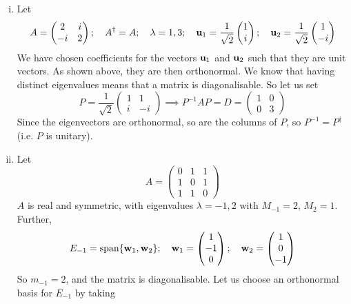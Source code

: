 \begin{enumerate}[(i)]
	\item Let
	      \[ A = \begin{pmatrix}
			      2 & i \\ -i & 2
		      \end{pmatrix};\quad A^\dagger = A;\quad \lambda = 1, 3;\quad\vb u_1 = \frac{1}{\sqrt{2}} \begin{pmatrix}
			      1 \\i
		      \end{pmatrix};\quad\vb u_2 = \frac{1}{\sqrt{2}} \begin{pmatrix}
			      1 \\-i
		      \end{pmatrix} \]
	      We have chosen coefficients for the vectors $\vb u_1$ and $\vb u_2$ such that they are unit vectors. As shown above, they are then orthonormal. We know that having distinct eigenvalues means that a matrix is diagonalisable. So let us set
	      \[ P =  \frac{1}{\sqrt{2}} \begin{pmatrix}
			      1 & 1 \\ i & -i
		      \end{pmatrix} \implies P^{-1}AP = D = \begin{pmatrix}
			      1 & 0 \\ 0 & 3
		      \end{pmatrix} \]
	      Since the eigenvectors are orthonormal, so are the columns of $P$, so $P^{-1} = P^\dagger$ (i.e. $P$ is unitary).
	\item Let
	      \[ A = \begin{pmatrix}
			      0 & 1 & 1 \\ 1 & 0 & 1 \\ 1 & 1 & 0
		      \end{pmatrix} \]
	      $A$ is real and symmetric, with eigenvalues $\lambda = -1, 2$ with $M_{-1} = 2$, $M_2 = 1$. Further,
	      \[ E_{-1} = \operatorname{span} \{ \vb w_1, \vb w_2 \};\quad \vb w_1 = \begin{pmatrix}
			      1 \\ -1 \\ 0
		      \end{pmatrix};\quad \vb w_2 = \begin{pmatrix}
			      1 \\ 0 \\ -1
		      \end{pmatrix} \]
	      So $m_{-1} = 2$, and the matrix is diagonalisable. Let us choose an orthonormal basis for $E_{-1}$ by taking

\end{enumerate}
